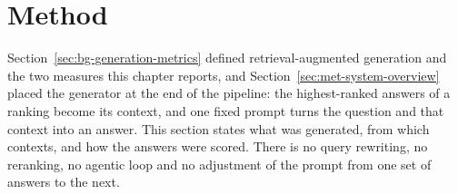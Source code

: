 
\section{Method}\label{sec:gen-method}

Section~\ref{sec:bg-generation-metrics} defined retrieval-augmented generation and the two
measures this chapter reports, and Section~\ref{sec:met-system-overview} placed the generator at
the end of the pipeline: the highest-ranked answers of a ranking become its context, and one fixed
prompt turns the question and that context into an answer. This section states what was generated,
from which contexts, and how the answers were scored. There is no query rewriting, no reranking, no
agentic loop and no adjustment of the prompt from one set of answers to the next.

